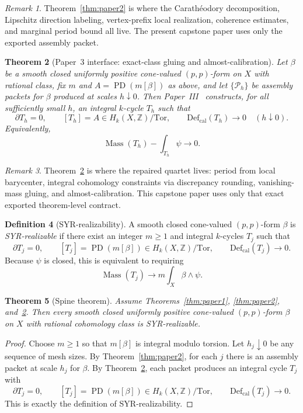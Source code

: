\documentclass[11pt]{article}
\numberwithin{equation}{section}
\theoremstyle{plain}
\newtheorem{theorem}{Theorem}[section]
\theoremstyle{definition}
\newtheorem{definition}[theorem]{Definition}
\theoremstyle{remark}
\newtheorem{remark}[theorem]{Remark}
\DeclareMathOperator{\Mass}{Mass}
\DeclareMathOperator{\PD}{PD}
\newcommand{\Z}{\mathbb{Z}}
\newcommand{\Defcal}{\mathrm{Def}_{\mathrm{cal}}}
\newcommand{\Tor}{\mathrm{Tor}}
\begin{document}
\begin{remark}
Theorem~\ref{thm:paper2} is where the Carath\'eodory decomposition, Lipschitz direction labeling, vertex-prefix local realization, coherence estimates, and marginal period bound all live.  The present capstone paper uses only the exported assembly packet.
\end{remark}

\begin{theorem}[Paper~3 interface: exact-class gluing and almost-calibration]\label{thm:paper3}
Let $\beta$ be a smooth closed uniformly positive cone-valued $(p,p)$-form on $X$ with rational class, fix $m$ and $A=\PD(m[\beta])$ as above, and let $\{\mathcal P_h\}$ be assembly packets for $\beta$ produced at scales $h\downarrow 0$. Then Paper~III~\cite[Thm.~1.1]{Washburn26III} constructs, for all sufficiently small $h$, an integral $k$-cycle $T_h$ such that
\[
\partial T_h=0,
\qquad
[T_h]=A\in H_k(X,\Z)/\Tor,
\qquad
\Defcal(T_h)\longrightarrow 0
\quad (h\downarrow 0).
\]
Equivalently,
\[
\Mass(T_h)-\int_{T_h}\psi\longrightarrow 0.
\]
\end{theorem}

\begin{remark}
Theorem~\ref{thm:paper3} is where the repaired quartet lives: period from local barycenter, integral cohomology constraints via discrepancy rounding, vanishing-mass gluing, and almost-calibration. This capstone paper uses only that exact exported theorem-level contract.
\end{remark}

\begin{definition}[SYR-realizability]\label{def:syr}
A smooth closed cone-valued $(p,p)$-form $\beta$ is \emph{SYR-realizable} if there exist an integer $m\ge 1$ and integral $k$-cycles $T_j$ such that
\[
\partial T_j=0,
\qquad
[T_j]=\PD(m[\beta])\in H_k(X,\Z)/\Tor,
\qquad
\Defcal(T_j)\to 0.
\]
Because $\psi$ is closed, this is equivalent to requiring
\[
\Mass(T_j)\to m\int_X \beta\wedge\psi.
\]
\end{definition}

\begin{theorem}[Spine theorem]\label{thm:spine}
Assume Theorems~\ref{thm:paper1}, \ref{thm:paper2}, and~\ref{thm:paper3}. Then every smooth closed uniformly positive cone-valued $(p,p)$-form $\beta$ on $X$ with rational cohomology class is SYR-realizable.
\end{theorem}

\begin{proof}
Choose $m\ge 1$ so that $m[\beta]$ is integral modulo torsion. Let $h_j\downarrow 0$ be any sequence of mesh sizes. By Theorem~\ref{thm:paper2}, for each $j$ there is an assembly packet at scale $h_j$ for $\beta$. By Theorem~\ref{thm:paper3}, each packet produces an integral cycle $T_j$ with
\[
\partial T_j=0,
\qquad
[T_j]=\PD(m[\beta])\in H_k(X,\Z)/\Tor,
\qquad
\Defcal(T_j)\to 0.
\]
This is exactly the definition of SYR-realizability.
\end{proof}
\end{document}
